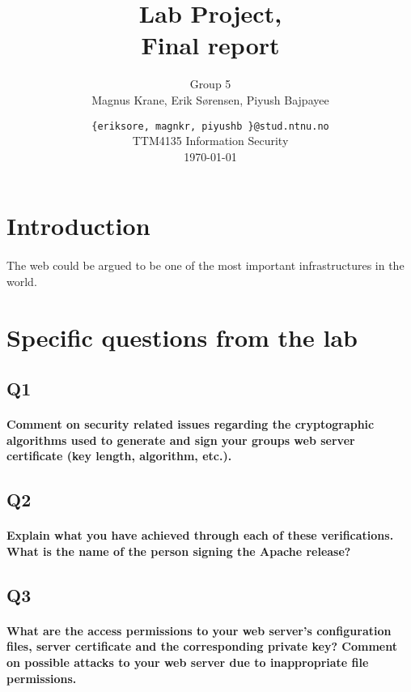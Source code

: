 \documentclass[a4paper,11pt]{article}
\title{Lab Project,\\Final report}
\author{Group 5 \\Magnus Krane, Erik S\o rensen, Piyush Bajpayee}
\date{ {\tt \{eriksore, magnkr, piyushb \}@stud.ntnu.no}\\
TTM4135 Information Security\\
\today}
\begin{document}
\maketitle
\vspace{3cm}

\begin{abstract}

\end{abstract}
\section*{Introduction}
\paragraph{}The web could be argued to be one of the most important infrastructures in the world.
\section{Specific questions from the lab}
\subsection{Q1}
\paragraph{Comment on security related issues regarding the cryptographic algorithms used to
generate and sign your groups web server certiﬁcate (key length, algorithm, etc.).}
\subsection{Q2}
\paragraph{Explain what you have achieved through each of these veriﬁcations. What is the name of
the person signing the Apache release?}
\subsection{Q3}
\paragraph{What are the access permissions to your web server’s conﬁguration ﬁles, server certiﬁcate
and the corresponding private key? Comment on possible attacks to your web server due to
inappropriate ﬁle permissions.}
\end{document}
